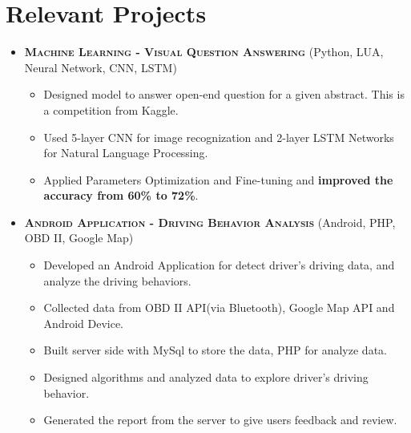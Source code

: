\documentclass[letterpaper,11pt]{article}
\begin{document}
\section{Relevant Projects}
\begin{itemize}\setlength\itemindent{-0.2in}
	\item [] \textbf{\textsc{Machine Learning - Visual Question Answering}} (Python, LUA, Neural Network, CNN, LSTM)
	\setlength\itemsep{0em}
	\begin{itemize}[topsep=-1em]
	\setlength\itemindent{-0.25in}  %
	\setlength\itemsep{-0.1em} %
		\item [\textbullet]Designed model to answer open-end question for a given abstract. This is a competition from Kaggle.
		\item [\textbullet]Used 5-layer CNN for image recognization and 2-layer LSTM Networks for Natural Language Processing.
		\item [\textbullet]Applied Parameters Optimization and Fine-tuning and \textbf{improved the accuracy from 60\% to 72\%}.
	\end{itemize}
	
	
	
	\item [] \textbf{\textsc{Android Application -  Driving Behavior Analysis}} (Android, PHP, OBD II, Google Map)
	\setlength\itemsep{0em}
	
	\begin{itemize}[topsep=-1em]
	\setlength\itemindent{-0.25in}  %
	\setlength\itemsep{-0.1em} %
		\item [\textbullet]Developed an Android Application for detect driver\rq s driving data, and analyze the driving behaviors.
		\item [\textbullet]Collected data from OBD II API(via Bluetooth), Google Map API and Android Device. 
		\item [\textbullet]Built server side with MySql to store the data, PHP for analyze data.
		\item [\textbullet]Designed algorithms and analyzed data to explore driver\rq s driving behavior.
		\item [\textbullet]Generated the report from the server to give users feedback and review.
	\end{itemize}
	
	
	

\end{itemize}
\end{document}
